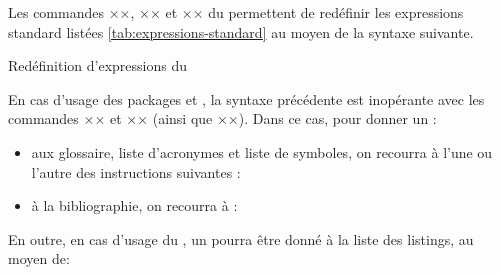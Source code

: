 Les commandes ×\addto×, ×\captionsfrench× et ×\captionsenglish× du
 permettent de redéfinir les expressions standard listées
\vref{tab:expressions-standard} au moyen de la syntaxe suivante.
\begin{preamblecode}[title=Par exemple dans le \File{\configurationfile}]
\addto{}
\addto{}
\end{preamblecode}
\begin{table}[hb]
  \centering
  
  \caption{Valeurs et commandes d'expressions standard du }
  \label{tab:expressions-standard}
\end{table}
\begin{dbexample}{Redéfinition d'expressions du }{}
\begin{preamblecode}[title=Par exemple dans le \File{\configurationfile}]
\addto{}
\addto{}
\end{preamblecode}
\end{dbexample}

En cas d'usage des packages  et , la
syntaxe précédente est inopérante avec les commandes ×\glossaryname× et
×\bibname× (ainsi que ×\refname×). Dans ce cas, pour donner un  :
\begin{itemize}
\item aux glossaire, liste d'acronymes et liste de symboles, on recourra
  à l'une ou l'autre des instructions suivantes :
\begin{bodycode}
\printglossary[title=÷\meta{titre alternatif}÷]
\printglossaries[title=÷\meta{titre alternatif}÷]
\printacronyms[title=÷\meta{titre alternatif}÷]
\printsymbols[title=÷\meta{titre alternatif}÷]
\end{bodycode}
\item à la bibliographie, on recourra à :
\begin{bodycode}
\printbibliography[title=÷\meta{titre alternatif}÷]
\end{bodycode}
\end{itemize}

En outre, en cas d'usage du , un 
pourra être donné à la liste des listings, au moyen de:
\begin{preamblecode}[title=Par exemple dans le \File{\configurationfile}]
\renewcommand\lstlistingname{÷\meta{titre alternatif}÷}
\end{preamblecode}

